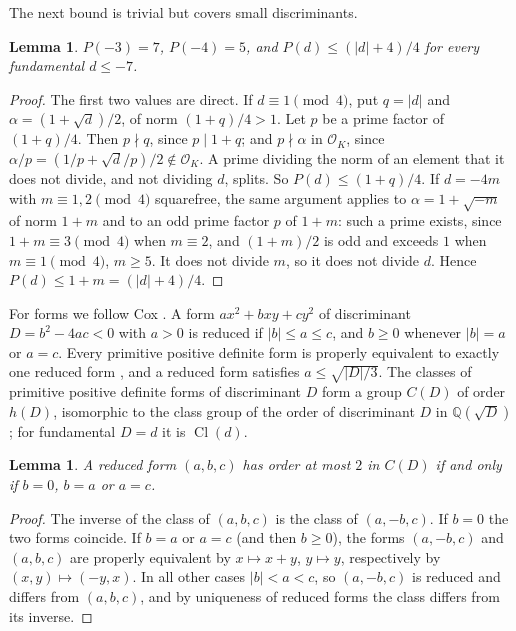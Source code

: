 \documentclass[11pt]{amsart}
\newtheorem{lemma}[theorem]{Lemma}
\theoremstyle{definition}
\theoremstyle{remark}
\numberwithin{equation}{section}
\newcommand{\Q}{\mathbb{Q}}
\DeclareMathOperator{\Cl}{Cl}
\begin{document}
The next bound is trivial but covers small discriminants.

\begin{lemma}\label{lem:trivial}
$P(-3)=7$, $P(-4)=5$, and $P(d)\le(|d|+4)/4$ for every fundamental $d\le-7$.
\end{lemma}

\begin{proof}
The first two values are direct. If $d\equiv1\pmod4$, put $q=|d|$ and $\alpha=(1+\sqrt d)/2$, of norm $(1+q)/4>1$. Let $p$ be a prime factor of $(1+q)/4$. Then $p\nmid q$, since $p\mid 1+q$; and $p\nmid\alpha$ in $\mathcal O_K$, since $\alpha/p=(1/p+\sqrt d/p)/2\notin\mathcal O_K$. A prime dividing the norm of an element that it does not divide, and not dividing $d$, splits. So $P(d)\le(1+q)/4$. If $d=-4m$ with $m\equiv1,2\pmod4$ squarefree, the same argument applies to $\alpha=1+\sqrt{-m}$ of norm $1+m$ and to an odd prime factor $p$ of $1+m$: such a prime exists, since $1+m\equiv3\pmod 4$ when $m\equiv2$, and $(1+m)/2$ is odd and exceeds $1$ when $m\equiv1\pmod4$, $m\ge5$. It does not divide $m$, so it does not divide $d$. Hence $P(d)\le1+m=(|d|+4)/4$.
\end{proof}

For forms we follow Cox \cite{Cox13}. A form $ax^2+bxy+cy^2$ of discriminant $D=b^2-4ac<0$ with $a>0$ is reduced if $|b|\le a\le c$, and $b\ge0$ whenever $|b|=a$ or $a=c$. Every primitive positive definite form is properly equivalent to exactly one reduced form \cite[Theorem 2.8]{Cox13}, and a reduced form satisfies $a\le\sqrt{|D|/3}$. The classes of primitive positive definite forms of discriminant $D$ form a group $C(D)$ of order $h(D)$, isomorphic to the class group of the order of discriminant $D$ in $\Q(\sqrt D)$ \cite[Theorem 7.7]{Cox13}; for fundamental $D=d$ it is $\Cl(d)$.

\begin{lemma}\label{lem:ambiguous}
A reduced form $(a,b,c)$ has order at most $2$ in $C(D)$ if and only if $b=0$, $b=a$ or $a=c$.
\end{lemma}

\begin{proof}
The inverse of the class of $(a,b,c)$ is the class of $(a,-b,c)$. If $b=0$ the two forms coincide. If $b=a$ or $a=c$ (and then $b\ge0$), the forms $(a,-b,c)$ and $(a,b,c)$ are properly equivalent by $x\mapsto x+y$, $y\mapsto y$, respectively by $(x,y)\mapsto(-y,x)$. In all other cases $|b|<a<c$, so $(a,-b,c)$ is reduced and differs from $(a,b,c)$, and by uniqueness of reduced forms the class differs from its inverse.
\end{proof}
\end{document}
